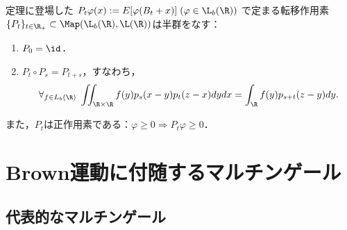 \documentclass[uplatex,dvipdfmx]{jsreport}
\begin{document}
\begin{corollary}[Brown運動の遷移確率]
    定理に登場した
    $P_t\varphi(x):=E[\varphi(B_t+x)]\;(\varphi\in \L_b(\R))$
    で定まる転移作用素$\{P_t\}_{t\in\R_+}\subset\Map(\L_b(\R),\L(\R))$は半群をなす：
    \begin{enumerate}
        \item $P_0=\id$．
        \item $P_t\circ P_s=P_{t+s}$，すなわち，
        \[\forall_{f\in L_b(\R)}\;\iint_{\R\times\R} f(y)p_s(x-y)p_t(z-x)dydx=\int_\R f(y)p_{s+t}(z-y)dy.\]
    \end{enumerate}
    また，$P_t$は正作用素である：$\varphi\ge0\Rightarrow P_t\varphi\ge0$．
\end{corollary}

\section{Brown運動に付随するマルチンゲール}

\subsection{代表的なマルチンゲール}
\end{document}
